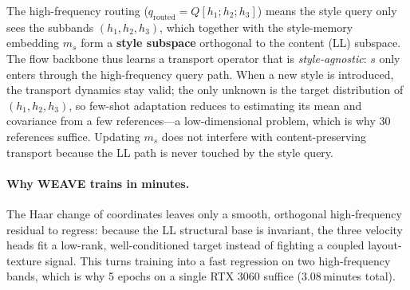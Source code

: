 \documentclass[letterpaper]{article}
\begin{document}
The high-frequency routing ($q_{\mathrm{routed}} = Q[h_1;h_2;h_3]$) means the style query only sees the subbands $(h_1,h_2,h_3)$, which together with the style-memory embedding $m_s$ form a \textbf{style subspace} orthogonal to the content (LL) subspace.
The flow backbone thus learns a transport operator that is \emph{style-agnostic}: $s$ only enters through the high-frequency query path.
When a new style is introduced, the transport dynamics stay valid; the only unknown is the target distribution of $(h_1,h_2,h_3)$, so few-shot adaptation reduces to estimating its mean and covariance from a few references---a low-dimensional problem, which is why 30 references suffice.
Updating $m_s$ does not interfere with content-preserving transport because the LL path is never touched by the style query.

\paragraph{Why WEAVE trains in minutes.}
The Haar change of coordinates leaves only a smooth, orthogonal high-frequency residual to regress: because the LL structural base is invariant, the three velocity heads fit a low-rank, well-conditioned target instead of fighting a coupled layout-texture signal.
This turns training into a fast regression on two high-frequency bands, which is why 5 epochs on a single RTX 3060 suffice (3.08\,minutes total).
\end{document}
